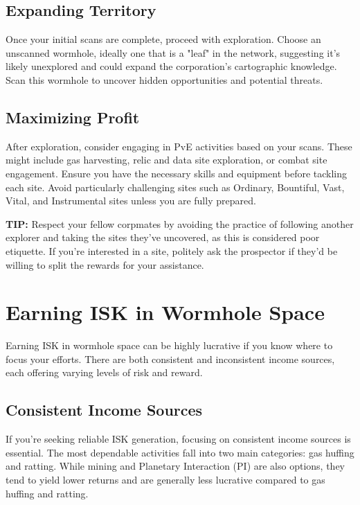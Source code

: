 \documentclass[a4paper,12pt]{article}
\begin{document}
\subsection{Expanding Territory}

Once your initial scans are complete, proceed with exploration. Choose an unscanned wormhole, ideally one that is a "leaf" in the network, suggesting it’s likely unexplored and could expand the corporation’s cartographic knowledge. Scan this wormhole to uncover hidden opportunities and potential threats.

\subsection{Maximizing Profit}

After exploration, consider engaging in PvE activities based on your scans. These might include gas harvesting, relic and data site exploration, or combat site engagement. Ensure you have the necessary skills and equipment before tackling each site. Avoid particularly challenging sites such as Ordinary, Bountiful, Vast, Vital, and Instrumental sites unless you are fully prepared.

\textsf{\textbf{TIP:}} \textsf{Respect your fellow corpmates by avoiding the practice of following another explorer and taking the sites they’ve uncovered, as this is considered poor etiquette. If you’re interested in a site, politely ask the prospector if they’d be willing to split the rewards for your assistance.}

\section{Earning ISK in Wormhole Space}

Earning ISK in wormhole space can be highly lucrative if you know where to focus your efforts. There are both consistent and inconsistent income sources, each offering varying levels of risk and reward.

\subsection{Consistent Income Sources}

If you’re seeking reliable ISK generation, focusing on consistent income sources is essential. The most dependable activities fall into two main categories: gas huffing and ratting. While mining and Planetary Interaction (PI) are also options, they tend to yield lower returns and are generally less lucrative compared to gas huffing and ratting.
\end{document}
